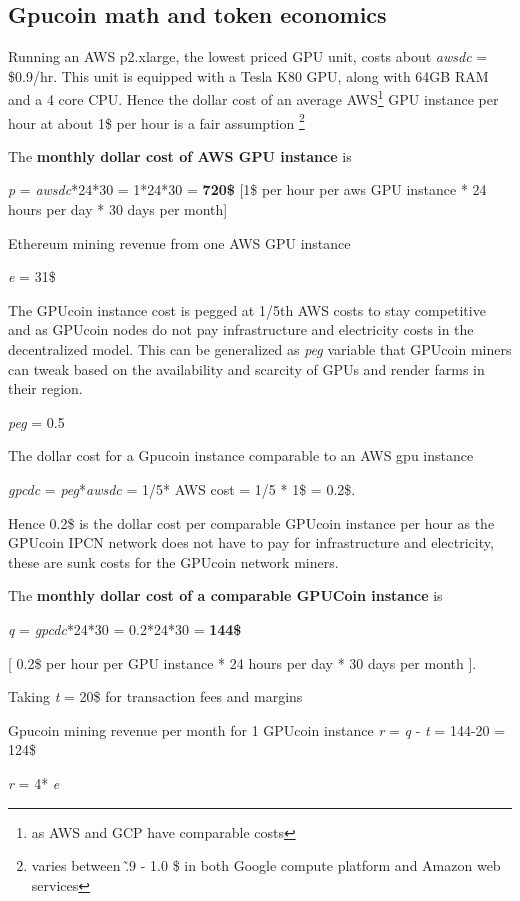 \subsection{Gpucoin math and token economics}
Running an AWS p2.xlarge, the lowest priced GPU unit, costs about \emph{awsdc} = \$0.9/hr. This unit is equipped with a Tesla K80 GPU, along with 64GB RAM and a 4 core CPU. 
Hence the dollar cost of an average AWS\footnote{as AWS and GCP have comparable costs} GPU instance per hour at about 1\$ per hour is a fair assumption \footnote{ varies between \~.9 - 1.0 \$ in both Google compute platform and Amazon web services}

The \textbf{monthly dollar cost of AWS GPU instance} is

\emph{p} = \emph{awsdc}*24*30 = 1*24*30 = \textbf{720\$  } [1\$ per hour per aws GPU instance * 24 hours per day * 30 days per month]

Ethereum mining revenue from one AWS GPU instance

\emph{e} = 31\$

The GPUcoin instance cost is pegged at 1/5th AWS costs to stay competitive and as GPUcoin nodes do not pay infrastructure and electricity costs in the decentralized model. This can be generalized as \emph{peg} variable that GPUcoin miners can tweak based on the availability and scarcity of GPUs and render farms in their region.

\emph{peg} = 0.5

The dollar cost for a Gpucoin instance comparable to an AWS gpu instance 

\emph{gpcdc} = \emph{peg}*\emph{awsdc} =  1/5* AWS cost = 1/5 * 1\$ = 0.2\$.

 Hence 0.2\$ is the dollar cost per comparable GPUcoin instance per hour as the GPUcoin IPCN network does not have to pay for infrastructure and electricity, these are sunk costs for the GPUcoin network miners.

The \textbf{monthly dollar cost of a comparable GPUCoin instance} is 

\emph{q} = \emph{gpcdc}*24*30 = 0.2*24*30 = \textbf{144\$ }

[ 0.2\$ per hour per GPU instance * 24 hours per day * 30 days per month ].


Taking \emph{t} = 20\$ for transaction fees and margins

Gpucoin mining revenue per month for 1 GPUcoin instance
\emph{r} = \emph{q} - \emph{t} = 144-20 = 124\$

\emph{r} = 4* \emph{e} 

